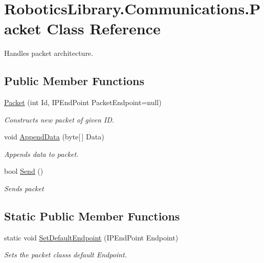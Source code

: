 \hypertarget{class_robotics_library_1_1_communications_1_1_packet}{}\section{Robotics\+Library.\+Communications.\+Packet Class Reference}
\label{class_robotics_library_1_1_communications_1_1_packet}


Handles packet architecture.  


\subsection*{Public Member Functions}
\begin{DoxyCompactItemize}
\item 
\hyperlink{class_robotics_library_1_1_communications_1_1_packet_a959df60d7fb5b840f1ac17f2558287d9}{Packet} (int Id, I\+P\+End\+Point Packet\+Endpoint=null)
\begin{DoxyCompactList}\small\item\em Constructs new packet of given ID. \end{DoxyCompactList}\item 
void \hyperlink{class_robotics_library_1_1_communications_1_1_packet_a047afd1596cdeb703ff7fe965a6a15ee}{Append\+Data} (byte\mbox{[}$\,$\mbox{]} Data)
\begin{DoxyCompactList}\small\item\em Appends data to packet. \end{DoxyCompactList}\item 
bool \hyperlink{class_robotics_library_1_1_communications_1_1_packet_aea2ef8cc2357083a18bf3c1da0b0bdec}{Send} ()
\begin{DoxyCompactList}\small\item\em Sends packet \end{DoxyCompactList}\end{DoxyCompactItemize}
\subsection*{Static Public Member Functions}
\begin{DoxyCompactItemize}
\item 
static void \hyperlink{class_robotics_library_1_1_communications_1_1_packet_a95a0bb161aa290379b3d016b02707e93}{Set\+Default\+Endpoint} (I\+P\+End\+Point Endpoint)
\begin{DoxyCompactList}\small\item\em Sets the packet class\textquotesingle{}s default Endpoint. \end{DoxyCompactList}\end{DoxyCompactItemize}


